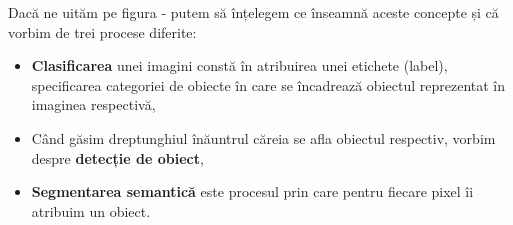 Dacă ne uităm pe figura - putem să înțelegem ce înseamnă aceste concepte și că vorbim de trei procese diferite:
\begin{itemize}
	\item \textbf{Clasificarea} unei imagini constă în atribuirea unei etichete (label), specificarea categoriei de obiecte în care se încadrează obiectul reprezentat în imaginea respectivă,
	\item Când găsim dreptunghiul înăuntrul căreia se afla obiectul respectiv, vorbim despre \textbf{detecție de obiect},
	\item \textbf{Segmentarea semantică} este procesul prin care pentru fiecare pixel îi atribuim un obiect.
\end{itemize}
